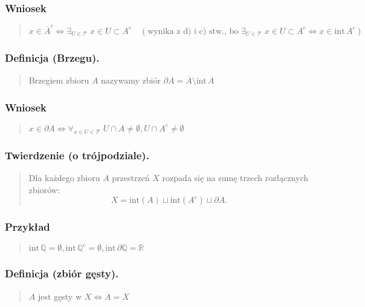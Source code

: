 \documentclass[10pt,a4paper]{article}
\begin{document}
{    \subsubsection*{Wniosek}
    \begin{quote}
    $x \in \overline{A}^c \iff \exists_{U \in \mathcal{T}} \; x \in U \subset A^c \quad (\text{wynika z d) i c) stw., bo } \exists_{U \in \mathcal{T}} \; x \in U \subset A^c \iff x \in \mathrm{int}\, A^c)$
    \end{quote}

    \subsubsection*{Definicja (Brzegu).}
    \begin{quote}
    Brzegiem zbioru $A$ nazywamy zbiór $\partial A = \overline{A} \setminus \mathrm{int}\, A$
    \end{quote}

    \subsubsection*{Wniosek}
    \begin{quote}
        $x \in \partial A \iff \forall_{x \in U \in \mathcal{T}} \; U \cap A \neq \emptyset, U \cap A^c \neq \emptyset$
    \end{quote}

    \subsubsection*{Twierdzenie (o trójpodziale).}
    \begin{quote} Dla każdego zbioru $A$ przestrzeń $X$ rozpada się na sumę trzech rozłącznych zbiorów: \\
    $$X = \mathrm{int}(A) \sqcup \mathrm{int}(A^c) \sqcup \partial A.$$
    \end{quote}

    \subsubsection*{Przykład}
    \begin{quote}
    $\mathrm{int}\, \mathbb{Q} = \emptyset, \mathrm{int}\, \mathbb{Q}^c = \emptyset, \mathrm{int}\, \partial \mathbb{Q} = \mathbb{R}$
    \end{quote}

    \subsubsection*{Definicja (zbiór gęsty).}
    \begin{quote}
    $A$ jest gęsty w $X \iff \overline{A} = X$
    \end{quote}

}
\end{document}
